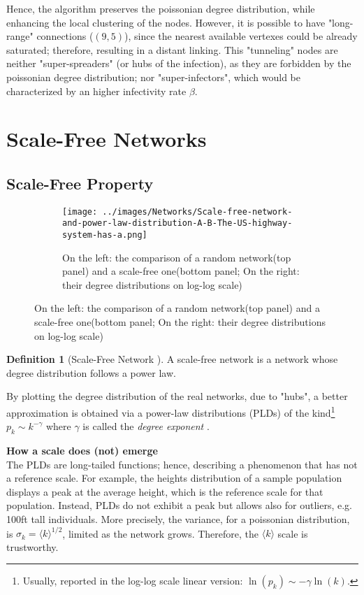\documentclass[a4paper,10pt,twoside]{book} %
\theoremstyle{definition}
\newtheorem{definition}{Definition}[section]
\begin{document}
Hence, the algorithm preserves the poissonian degree distribution, while enhancing the local clustering of the nodes. However, it is possible to have "long-range" connections ($(9,5)$), since the nearest available vertexes could be already saturated; therefore, resulting in a distant linking. This "tunneling" nodes are neither "super-spreaders" (or hubs of the infection), as they are forbidden by the poissonian degree distribution; nor "super-infectors", which would be characterized by an higher infectivity rate $\beta$.

\newpage
\section{Scale-Free Networks}
\subsection{Scale-Free Property}

\begin{figure}[h]
    \begin{subfigure}{\textwidth}
        \texttt{[image: ../images/Networks/Scale-free-network-and-power-law-distribution-A-B-The-US-highway-system-has-a.png]}
        \centering
        \caption{On the left: the comparison of a random network(top panel) and a scale-free one(bottom panel; On the right: their degree distributions on log-log scale) \cite{barabasi::2016networkbook}}
        \label{fig:PLDsVSEBDs}
    \end{subfigure}
\end{figure}

\begin{definition}[Scale-Free Network \cite{Barabasi:1999_ScalRndNet}]
	A scale-free network is a network whose degree distribution follows a power law.
\end{definition}

By plotting the degree distribution of the real networks, due to "hubs", a better approximation is obtained via a power-law distributions (PLDs) of the kind\footnote{Usually, reported in the log-log scale linear version: $\ln(p_k) \sim -\gamma \ln(k)$.} $p_k \sim k^{-\gamma}$  where $\gamma$ is called the \textit{degree exponent} . 

{\large \textbf{How a scale does (not) emerge}} \\
The PLDs are long-tailed functions; hence, describing a phenomenon that has not a reference scale.
For example, the heights distribution of a sample population displays a peak at the average height, which is the reference scale for that population. Instead, PLDs do not exhibit a peak but allows also for outliers, e.g. 100ft tall individuals.
More precisely, the variance, for a poissonian distribution, is $\sigma_k = \langle k \rangle ^ {1/2}$, limited as the network grows. Therefore, the $\langle k \rangle$ scale is trustworthy. 
\end{document}

